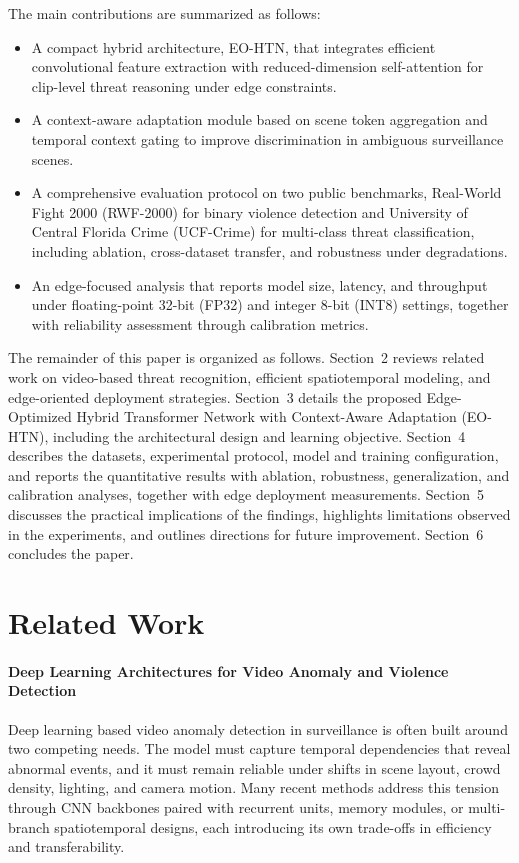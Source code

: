 \documentclass[AMA,Times1COL]{WileyNJDv5} %
\begin{document}
The main contributions are summarized as follows:

\begin{itemize}
  \item A compact hybrid architecture, EO-HTN, that integrates efficient convolutional feature extraction with reduced-dimension self-attention for clip-level threat reasoning under edge constraints.
  \item A context-aware adaptation module based on scene token aggregation and temporal context gating to improve discrimination in ambiguous surveillance scenes.
  \item A comprehensive evaluation protocol on two public benchmarks, Real-World Fight 2000 (RWF-2000) for binary violence detection and University of Central Florida Crime (UCF-Crime) for multi-class threat classification, including ablation, cross-dataset transfer, and robustness under degradations.
  \item An edge-focused analysis that reports model size, latency, and throughput under floating-point 32-bit (FP32) and integer 8-bit (INT8) settings, together with reliability assessment through calibration metrics.
\end{itemize}

The remainder of this paper is organized as follows. Section~2 reviews related work on video-based threat recognition, efficient spatiotemporal modeling, and edge-oriented deployment strategies. Section~3 details the proposed Edge-Optimized Hybrid Transformer Network with Context-Aware Adaptation (EO-HTN), including the architectural design and learning objective. Section~4 describes the datasets, experimental protocol, model and training configuration, and reports the quantitative results with ablation, robustness, generalization, and calibration analyses, together with edge deployment measurements. Section~5 discusses the practical implications of the findings, highlights limitations observed in the experiments, and outlines directions for future improvement. Section~6 concludes the paper.



\section{Related Work}
\paragraph{Deep Learning Architectures for Video Anomaly and Violence Detection}
Deep learning based video anomaly detection in surveillance is often built around two competing needs. The model must capture temporal dependencies that reveal abnormal events, and it must remain reliable under shifts in scene layout, crowd density, lighting, and camera motion. Many recent methods address this tension through CNN backbones paired with recurrent units, memory modules, or multi-branch spatiotemporal designs, each introducing its own trade-offs in efficiency and transferability.
\end{document}
